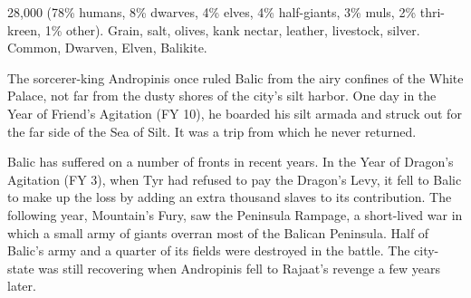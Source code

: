 {28,000 (78\% humans, 8\% dwarves, 4\% elves, 4\% half-giants, 3\% muls, 2\% thri-kreen, 1\% other).}
{Grain, salt, olives, kank nectar, leather, livestock, silver.}
{Common, Dwarven, Elven, Balikite.}
{
	The sorcerer-king Andropinis once ruled Balic from the airy confines of the White Palace, not far from the dusty shores of the city's silt harbor. One day in the Year of Friend's Agitation (FY 10), he boarded his silt armada and struck out for the far side of the Sea of Silt. It was a trip from which he never returned.

	Balic has suffered on a number of fronts in recent years. In the Year of Dragon's Agitation (FY 3), when Tyr had refused to pay the Dragon's Levy, it fell to Balic to make up the loss by adding an extra thousand slaves to its contribution. The following year, Mountain's Fury, saw the Peninsula Rampage, a short-lived war in which a small army of giants overran most of the Balican Peninsula. Half of Balic's army and a quarter of its fields were destroyed in the battle. The city-state was still recovering when Andropinis fell to Rajaat's revenge a few years later.
}
